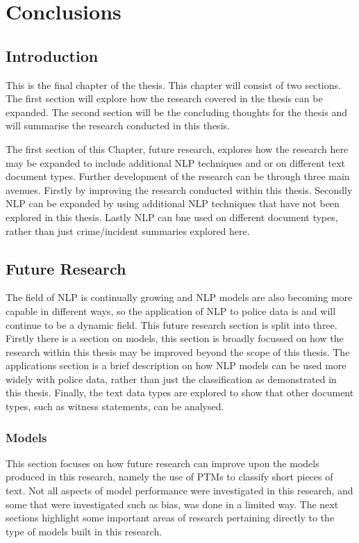 \chapter{Conclusions}

\section{Introduction} This is the final chapter of the thesis. This chapter will consist of two sections. The first section will explore how the research covered in the thesis can be expanded. The second section will be the concluding thoughts for the thesis and will summarise the research conducted in this thesis.  

The first section of this Chapter, future research, explores how the research here may be expanded to include additional NLP techniques and or on different text document types. Further development of the research can be through three main avenues. Firstly by improving the research conducted within this thesis. Secondly NLP can be expanded  by using additional NLP techniques that have not been explored in this thesis. Lastly NLP can bne used on different document types, rather than just crime/incident summaries explored here.  


\section{Future Research} The field of NLP is continually growing and NLP models are also becoming more capable in different ways, so the application of NLP to police data is and will continue to be a dynamic field. This future research section is split into three. Firstly there is a section on models, this section is broadly focussed on how the research within this thesis may be improved beyond the scope of this thesis.  The applications section is a brief description on how NLP models can be used more widely with police data, rather than just the classification as demonstrated in this thesis. Finally, the text data types are explored to show that other document types, such as witness statements, can be analysed. 

\subsection{Models}  This section focuses on how future research can improve upon the models produced in this research, namely the use of PTMs to classify short pieces of text. Not all aspects of model performance were investigated in this research, and some that were investigated such as bias, was done in a limited way. The next sections highlight some important areas of research pertaining directly to the type of models built in this research.

